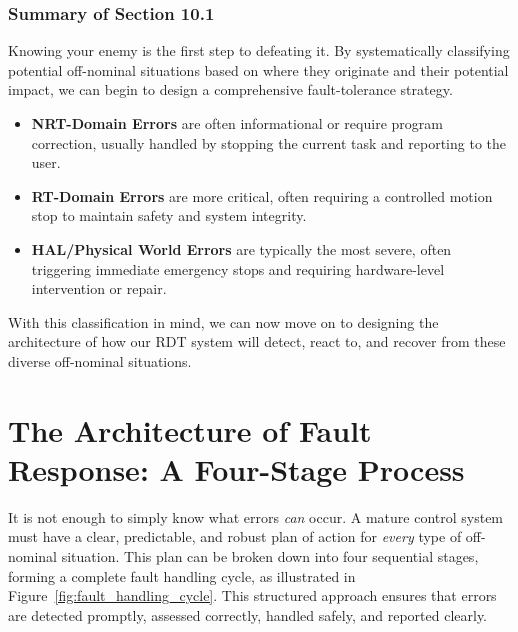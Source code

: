 \subsubsection{Summary of Section 10.1}
\label{subsubsec:section10_1_summary}
Knowing your enemy is the first step to defeating it. By systematically classifying potential off-nominal situations based on where they originate and their potential impact, we can begin to design a comprehensive fault-tolerance strategy.
\begin{itemize}
    \item \textbf{NRT-Domain Errors} are often informational or require program correction, usually handled by stopping the current task and reporting to the user.
    \item \textbf{RT-Domain Errors} are more critical, often requiring a controlled motion stop to maintain safety and system integrity.
    \item \textbf{HAL/Physical World Errors} are typically the most severe, often triggering immediate emergency stops and requiring hardware-level intervention or repair.
\end{itemize}
With this classification in mind, we can now move on to designing the architecture of how our RDT system will detect, react to, and recover from these diverse off-nominal situations.



\section{The Architecture of Fault Response: A Four-Stage Process}
\label{sec:fault_response_architecture}

It is not enough to simply know what errors \textit{can} occur. A mature control system must have a clear, predictable, and robust plan of action for \textit{every} type of off-nominal situation. This plan can be broken down into four sequential stages, forming a complete fault handling cycle, as illustrated in Figure~\ref{fig:fault_handling_cycle}. This structured approach ensures that errors are detected promptly, assessed correctly, handled safely, and reported clearly.


